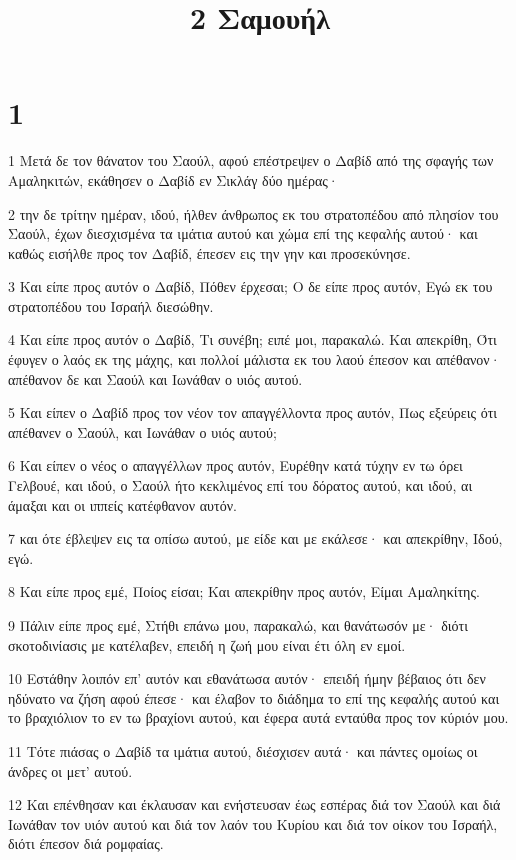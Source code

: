 

\title{2 Σαμουήλ}


\chapter{1}

\par 1 Μετά δε τον θάνατον του Σαούλ, αφού επέστρεψεν ο Δαβίδ από της σφαγής των Αμαληκιτών, εκάθησεν ο Δαβίδ εν Σικλάγ δύο ημέρας·
\par 2 την δε τρίτην ημέραν, ιδού, ήλθεν άνθρωπος εκ του στρατοπέδου από πλησίον του Σαούλ, έχων διεσχισμένα τα ιμάτια αυτού και χώμα επί της κεφαλής αυτού· και καθώς εισήλθε προς τον Δαβίδ, έπεσεν εις την γην και προσεκύνησε.
\par 3 Και είπε προς αυτόν ο Δαβίδ, Πόθεν έρχεσαι; Ο δε είπε προς αυτόν, Εγώ εκ του στρατοπέδου του Ισραήλ διεσώθην.
\par 4 Και είπε προς αυτόν ο Δαβίδ, Τι συνέβη; ειπέ μοι, παρακαλώ. Και απεκρίθη, Ότι έφυγεν ο λαός εκ της μάχης, και πολλοί μάλιστα εκ του λαού έπεσον και απέθανον· απέθανον δε και Σαούλ και Ιωνάθαν ο υιός αυτού.
\par 5 Και είπεν ο Δαβίδ προς τον νέον τον απαγγέλλοντα προς αυτόν, Πως εξεύρεις ότι απέθανεν ο Σαούλ, και Ιωνάθαν ο υιός αυτού;
\par 6 Και είπεν ο νέος ο απαγγέλλων προς αυτόν, Ευρέθην κατά τύχην εν τω όρει Γελβουέ, και ιδού, ο Σαούλ ήτο κεκλιμένος επί του δόρατος αυτού, και ιδού, αι άμαξαι και οι ιππείς κατέφθανον αυτόν.
\par 7 και ότε έβλεψεν εις τα οπίσω αυτού, με είδε και με εκάλεσε· και απεκρίθην, Ιδού, εγώ.
\par 8 Και είπε προς εμέ, Ποίος είσαι; Και απεκρίθην προς αυτόν, Είμαι Αμαληκίτης.
\par 9 Πάλιν είπε προς εμέ, Στήθι επάνω μου, παρακαλώ, και θανάτωσόν με· διότι σκοτοδινίασις με κατέλαβεν, επειδή η ζωή μου είναι έτι όλη εν εμοί.
\par 10 Εστάθην λοιπόν επ' αυτόν και εθανάτωσα αυτόν· επειδή ήμην βέβαιος ότι δεν ηδύνατο να ζήση αφού έπεσε· και έλαβον το διάδημα το επί της κεφαλής αυτού και το βραχιόλιον το εν τω βραχίονι αυτού, και έφερα αυτά ενταύθα προς τον κύριόν μου.
\par 11 Τότε πιάσας ο Δαβίδ τα ιμάτια αυτού, διέσχισεν αυτά· και πάντες ομοίως οι άνδρες οι μετ' αυτού.
\par 12 Και επένθησαν και έκλαυσαν και ενήστευσαν έως εσπέρας διά τον Σαούλ και διά Ιωνάθαν τον υιόν αυτού και διά τον λαόν του Κυρίου και διά τον οίκον του Ισραήλ, διότι έπεσον διά ρομφαίας.

